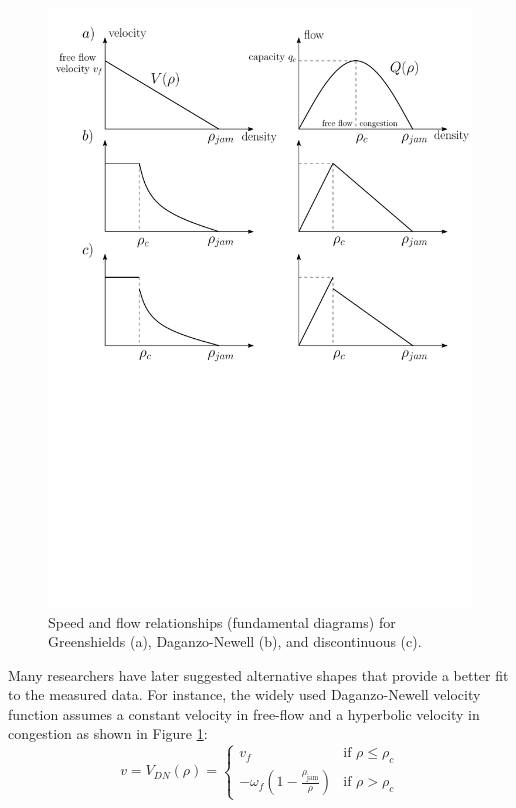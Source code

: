 \begin{figure}[ht]
  \centering
    \includegraphics[width=12cm]{fundamentalDiagram2.pdf}
    \caption{Speed and flow relationships (fundamental diagrams) for Greenshields (a), Daganzo-Newell (b), and discontinuous (c).}
    \label{fig:fundamentalDiagram}
\end{figure}

Many researchers have later suggested alternative shapes that provide a better fit to the measured data. For instance, the widely used Daganzo-Newell velocity function assumes a constant velocity in free-flow and a hyperbolic velocity in congestion as shown in Figure \ref{fig:fundamentalDiagram}:
\noindent 
\begin{equation}\label{eq:dnVelocity}
v = V_{DN}(\rho) = \begin{cases}
v_{f} & \text{if } \rho \leq \rho_{c} \\
-\omega_{f} \left( 1 - \frac{\rho_{\text{jam}}}{\rho} \right) & \text{if } \rho > \rho_{c}
\end{cases}
\end{equation}

